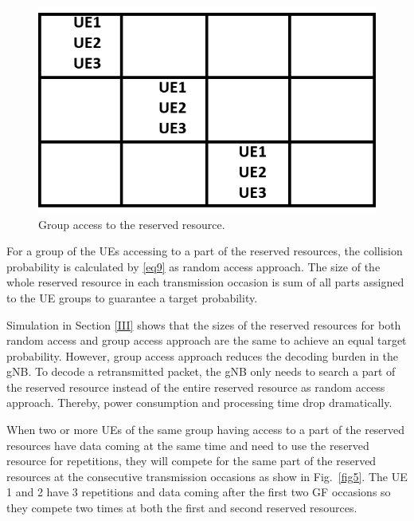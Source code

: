 \documentclass[conference]{IEEEtran}
\begin{document}
\begin{figure}[htbp]
\centerline{\includegraphics[scale=0.35]{fig4.png}}
\caption{Group access to the reserved resource.}
\label{fig4}
\end{figure}

For a group of the UEs accessing to a part of the reserved resources, the collision probability is calculated by \eqref{eq9} as random access approach. The size of the whole reserved resource in each transmission occasion is sum of all parts assigned to the UE groups to guarantee a target probability. 

Simulation in Section \ref{III} shows that the sizes of the reserved resources for both random access and group access approach are the same to achieve an equal target probability. However, group access approach reduces the decoding burden in the gNB. To decode a retransmitted packet, the gNB only needs to search a part of the reserved resource instead of the entire reserved resource as random access approach. Thereby, power consumption and processing time drop dramatically. 

When two or more UEs of the same group having access to a part of the reserved resources have data coming at the same time and need to use the reserved resource for repetitions, they will compete for the same part of the reserved resources at the consecutive transmission occasions as show in Fig.~\ref{fig5}. The UE 1 and 2 have 3 repetitions and data coming after the first two GF occasions so they compete two times at both the first and second reserved resources.
\end{document}
